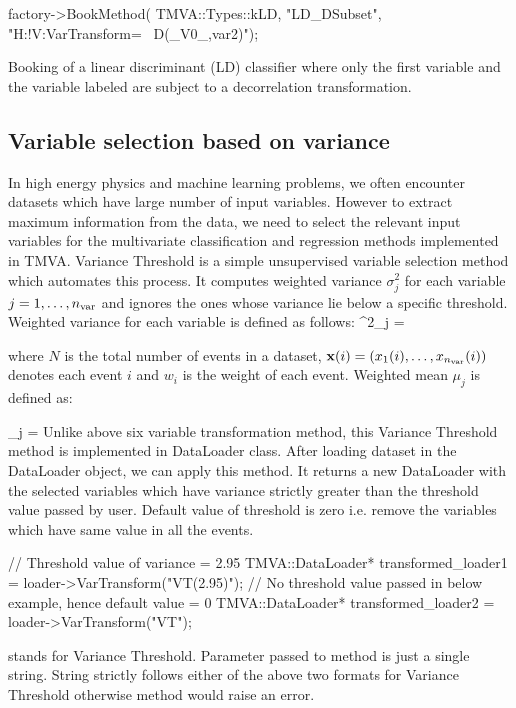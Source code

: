 \begin{codeexample}
\begin{tmvacode}
factory->BookMethod( TMVA::Types::kLD, "LD_DSubset", "H:!V:VarTransform= \
D(_V0_,var2)");
\end{tmvacode}
\caption[.]{\codeexampleCaptionSize Booking of a linear discriminant
  (LD) classifier where only the first variable and the variable
  labeled \code{var2} are subject to a decorrelation transformation.
}
\end{codeexample}

\subsection{Variable selection based on variance}
\label{sec:varianceThreshold}
In high energy physics and machine learning problems, we often encounter datasets which have large number of input variables. However to extract maximum information from the data, we need to select the relevant input variables for the multivariate classification and regression methods implemented in TMVA. Variance Threshold is a simple unsupervised variable selection method which automates this process.
It computes weighted variance $\sigma^2_{j}$ for each variable $j = 1,\dots,{{n_\text{var}}}$ and ignores the ones whose variance lie below a specific threshold. Weighted variance for each variable is defined as follows:
\beq
\label{eq:variancecalculation}
\sigma^2_{j} = 
\eeq

where $N$ is the total number of events in a dataset, ${\bf x}(i)=(x_1(i),\dots,x_{{n_\text{var}}}(i))$ denotes each event $i$ and $w_i$ is the weight of each event. Weighted mean $\mu_{j}$ is defined as: 

\beq
\label{eq:meanecalculation}
\mu_j = 
\eeq
Unlike above six variable transformation method, this Variance Threshold method is implemented in DataLoader class. After loading dataset in the DataLoader object, we can apply this method. It returns a new DataLoader with the selected variables which have variance strictly greater than the threshold value passed by user. Default value of threshold is zero i.e. remove the variables which have same value in all the events. 

\begin{codeexample}
\begin{tmvacode}
// Threshold value of variance = 2.95
TMVA::DataLoader* transformed_loader1 = loader->VarTransform("VT(2.95)");
// No threshold value passed in below example, hence default value = 0
TMVA::DataLoader* transformed_loader2 = loader->VarTransform("VT");
\end{tmvacode}
\caption[.]{\codeexampleCaptionSize {} stands for Variance Threshold. Parameter passed to  method is just a single string. String strictly follows either of the above two formats for Variance Threshold otherwise method would raise an error. 
}
\end{codeexample}


